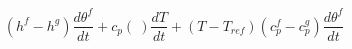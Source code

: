 \begin{equation}
(h^f-h^g) \frac{d\theta^f }{dt} + c_p(\ ) \frac{d T}{dt} +  (T- T_{ref}) (c_p^f-c_p^g) \frac{d\theta^f }{dt}
\end{equation}